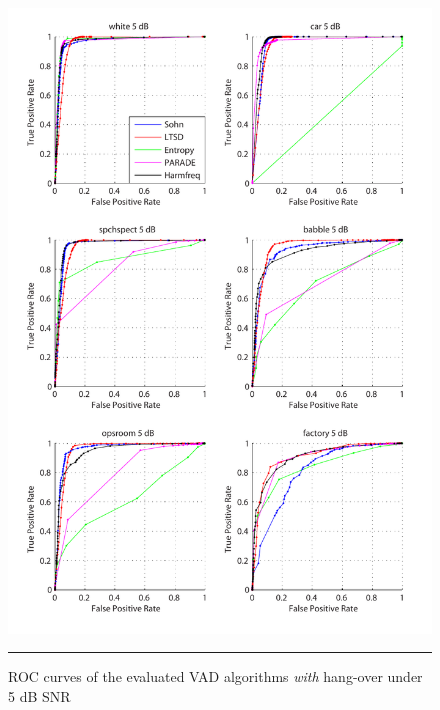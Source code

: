 \begin{figure}[htbp]
	\centering
		\includegraphics[width=1.0\columnwidth]{Figures/AppendixA/5dBh.pdf}
		\rule{37em}{0.5pt}
	\caption[ROC curves of the evaluated algorithms \emph{with} hang-over under 5 dB SNR]{ROC curves of the evaluated VAD algorithms \emph{with} hang-over under 5 dB SNR}
	\label{fig:5dBh}
\end{figure}

